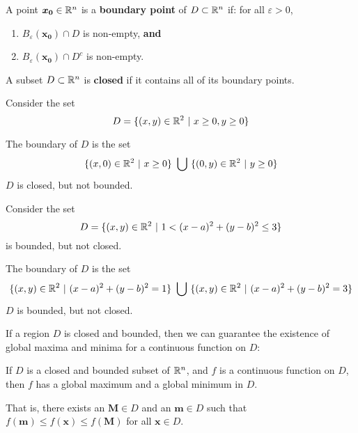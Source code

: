 \begin{definition}
A point $\bm{x_0} \in \mathbb{R}^n$ is a \textbf{boundary point} of $D \subset \mathbb{R}^n$ if: for all $\varepsilon > 0$,

\begin{enumerate}
    \item $B_\varepsilon(\bm{x_0}) \cap D$ is non-empty, \textbf{and}
    \item $B_\varepsilon(\bm{x_0}) \cap D^{c}$ is non-empty.
\end{enumerate}

\end{definition}

\begin{definition}
    A subset $D \subset \mathbb{R}^n$ is \textbf{closed} if it contains all of its boundary points.
        
    \end{definition}

\begin{example}
    Consider the set $$D = \{(x,y) \in \R^2 \ | \ x \geq 0, y \geq 0\}$$   
    
    The boundary of $D$ is the set $$\{(x,0) \in \mathbb{R}^2 \ | \ x \geq 0\} \ \bigcup \ \{(0,y) \in \mathbb{R}^2 \ | \ y \geq 0\}$$
    $D$ is closed, but not bounded.
\end{example}

\begin{example}
    Consider the set $$D = \{(x,y) \in \R^2 \ | \ 1 < (x-a)^2 + (y-b)^2  \leq 3 \}$$ is bounded, but not closed.
    
    The boundary of $D$ is the set $$\{(x,y) \in \mathbb{R}^2 \ | \  (x-a)^2 + (y-b)^2 =1 \} \ \bigcup \ \{(x,y) \in \mathbb{R}^2 \ | \ (x-a)^2 + (y-b)^2 = 3 \}$$
    $D$ is bounded, but not closed.
\end{example}

If a region $D$ is closed and bounded, then we can guarantee the existence of global maxima and minima for a continuous function on $D$:

\begin{theorem}
    If $D$ is a closed and bounded subset of $\mathbb{R}^n$, and $f$ is a continuous function on $D$, then $f$ 
    has a global maximum and a global minimum in $D$.
    
    \vspace{1em}
    
    That is, there exists an $\bm{M} \in D$ and an $\bm{m} \in D$ such that $f(\bm{m}) \leq f(\bm{x}) \leq f(\bm{M})$ for all $\bm{x} \in D$.
    \end{theorem}

